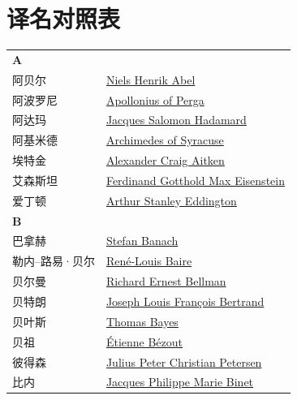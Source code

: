 \chapter{译名对照表}
\def\InsertTable#1{\begin{longtable}{ll} #1 \end{longtable}}%
\InsertTable{
	\textbf{A} \\
	阿贝尔 & \href{https://mathshistory.st-andrews.ac.uk/Biographies/Abel/}{Niels Henrik Abel} \\
	阿波罗尼 & \href{https://mathshistory.st-andrews.ac.uk/Biographies/Apollonius/}{Apollonius of Perga} \\
	阿达玛 & \href{https://mathshistory.st-andrews.ac.uk/Biographies/Hadamard/}{Jacques Salomon Hadamard} \\
	阿基米德 & \href{https://mathshistory.st-andrews.ac.uk/Biographies/Archimedes/}{Archimedes of Syracuse} \\
	埃特金 & \href{https://mathshistory.st-andrews.ac.uk/Biographies/Aitken/}{Alexander Craig Aitken} \\
	艾森斯坦 & \href{https://mathshistory.st-andrews.ac.uk/Biographies/Eisenstein/}{Ferdinand Gotthold Max Eisenstein} \\
	爱丁顿 & \href{https://mathshistory.st-andrews.ac.uk/Biographies/Eddington/}{Arthur Stanley Eddington} \\
	\textbf{B} \\
	巴拿赫 & \href{https://mathshistory.st-andrews.ac.uk/Biographies/Banach/}{Stefan Banach} \\
	勒内--路易·贝尔 & \href{https://mathshistory.st-andrews.ac.uk/Biographies/Baire/}{Ren\'e-Louis Baire} \\
	贝尔曼 & \href{https://mathshistory.st-andrews.ac.uk/Biographies/Bellman/}{Richard Ernest Bellman} \\
	贝特朗 & \href{https://mathshistory.st-andrews.ac.uk/Biographies/Bertrand/}{Joseph Louis Fran\c{c}ois Bertrand} \\
	贝叶斯 & \href{https://mathshistory.st-andrews.ac.uk/Biographies/Bayes/}{Thomas Bayes} \\
	贝祖 & \href{https://mathshistory.st-andrews.ac.uk/Biographies/Bezout/}{\'Etienne B\'ezout} \\
	彼得森 & \href{https://mathshistory.st-andrews.ac.uk/Biographies/Petersen/}{Julius Peter Christian Petersen} \\
	比内 & \href{https://mathshistory.st-andrews.ac.uk/Biographies/Binet/}{Jacques Philippe Marie Binet} \\
}
